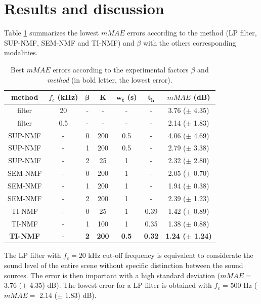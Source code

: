 \documentclass[review,5p,twocolumn,sort&compress,times]{elsarticle}
\begin{document}
\section{Results and discussion}\label{part:results}

Table \ref{tab:results} summarizes the lowest $mMAE$ errors according to the method (LP filter, SUP-NMF, SEM-NMF and TI-NMF) and $\beta$ with the others corresponding modalities.

\begin{table}[t]
\centering
\caption{Best $mMAE$ errors according to the experimental factors $\beta$ and \textit{method} (in bold letter, the lowest error).}
\begin{tabular}{@{}ccccccc@{}}
\toprule
\textbf{method} & $f_c$ (kHz) & $\mathbf{\beta}$ & $\mathbf{K}$ & $\mathbf{w_t}$ (s) &  $\mathbf{t_h}$ &  \textbf{$mMAE$} (dB) \\ \midrule
filter & 20 & - & - & - & - & 3.76 ($\pm$ 4.35) \\
filter & 0.5 & - & - & - & - & 2.14 ($\pm$ 1.83) \\
\hline \hline
SUP-NMF & - & 0 & 200 & 0.5 & - & 4.06 ($\pm$ 4.69) \\
SUP-NMF & - & 1 & 200 & 0.5 & - & 2.79 ($\pm$ 3.38) \\
SUP-NMF & - & 2 & 25 & 1 & - & 2.32  ($\pm$ 2.80) \\
\hline \hline
SEM-NMF & - & 0 & 200 & 1 & - & 2.05 ($\pm$ 0.70) \\
SEM-NMF & - & 1 & 200 & 1 & - & 1.94 ($\pm$ 0.38) \\
SEM-NMF & - & 2 & 200 & 1 & - & 2.39 ($\pm$ 1.23) \\
\hline \hline
TI-NMF & - & 0 & 25 & 1 & 0.39 & 1.42 ($\pm$ 0.89)\\
TI-NMF & - & 1 & 100 & 1 & 0.35 & 1.38 ($\pm$ 0.88)\\
\textbf{TI-NMF }& - & \textbf{2} & \textbf{200} & \textbf{0.5} & \textbf{0.32} & \textbf{1.24 ($\pm$ 1.24)}\\
\bottomrule
\end{tabular}
\label{tab:results}
\end{table}

The LP filter with $f_c = 20$ kHz cut-off frequency is equivalent to considerate the sound level of the entire scene without specific distinction between the sound sources. The error is then important with a high standard deviation ($mMAE =$ 3.76 ($\pm$ 4.35) dB). The lowest error for a LP filter is obtained with $f_c$ = 500 Hz ($mMAE =$ 2.14 ($\pm$ 1.83) dB).
\end{document}
